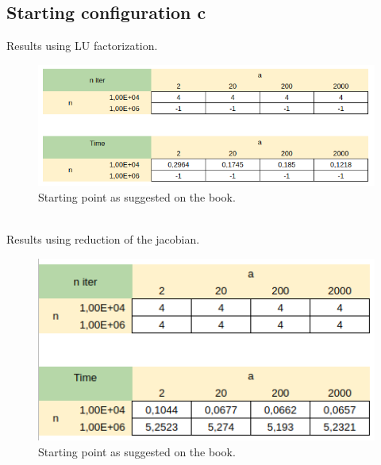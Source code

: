 \documentclass[]{article}
\begin{document}
\subsection{Starting configuration c}
Results using LU factorization.\\
\begin{figure}[h]
	\includegraphics[width=12cm]{table4.png}
	\caption{Starting point as suggested on the book.}
\end{figure}\\
Results using reduction of the jacobian.
\begin{figure}[h]
	\includegraphics[width=12cm]{table1.png}
	\caption{Starting point as suggested on the book.}
\end{figure}
\end{document}
